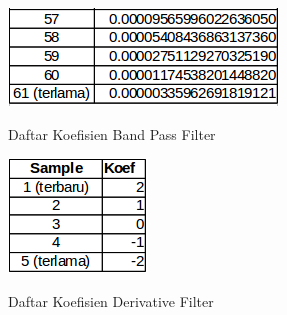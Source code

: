 \begin{table}[htbp]
	\includegraphics[scale=0.6]{images/koef3.png}
	\caption{Daftar Koefisien Band Pass Filter}
\end{table}
\begin{table}[htbp]
	\centering
	\includegraphics[scale=0.8]{images/koef4.png}
	\caption{Daftar Koefisien Derivative Filter}
\end{table}